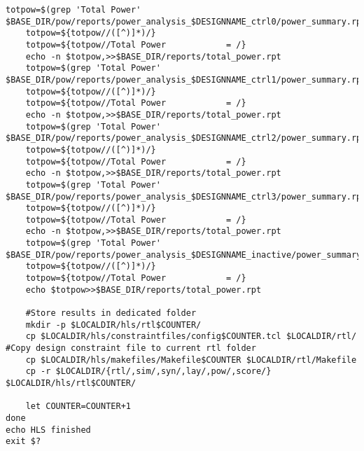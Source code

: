 \begin{lstlisting}[caption={HLS Script source code},label=lst:hlsscriptsourcecode]
	totpow=$(grep 'Total Power' $BASE_DIR/pow/reports/power_analysis_$DESIGNNAME_ctrl0/power_summary.rpt)
	totpow=${totpow//([^)]*)/}
	totpow=${totpow//Total Power            = /}
	echo -n $totpow,>>$BASE_DIR/reports/total_power.rpt
	totpow=$(grep 'Total Power' $BASE_DIR/pow/reports/power_analysis_$DESIGNNAME_ctrl1/power_summary.rpt)
	totpow=${totpow//([^)]*)/}
	totpow=${totpow//Total Power            = /}
	echo -n $totpow,>>$BASE_DIR/reports/total_power.rpt
	totpow=$(grep 'Total Power' $BASE_DIR/pow/reports/power_analysis_$DESIGNNAME_ctrl2/power_summary.rpt)
	totpow=${totpow//([^)]*)/}
	totpow=${totpow//Total Power            = /}
	echo -n $totpow,>>$BASE_DIR/reports/total_power.rpt
	totpow=$(grep 'Total Power' $BASE_DIR/pow/reports/power_analysis_$DESIGNNAME_ctrl3/power_summary.rpt)
	totpow=${totpow//([^)]*)/}
	totpow=${totpow//Total Power            = /}
	echo -n $totpow,>>$BASE_DIR/reports/total_power.rpt
	totpow=$(grep 'Total Power' $BASE_DIR/pow/reports/power_analysis_$DESIGNNAME_inactive/power_summary.rpt)
	totpow=${totpow//([^)]*)/}
	totpow=${totpow//Total Power            = /}
	echo $totpow>>$BASE_DIR/reports/total_power.rpt
	
	#Store results in dedicated folder
	mkdir -p $LOCALDIR/hls/rtl$COUNTER/
	cp $LOCALDIR/hls/constraintfiles/config$COUNTER.tcl $LOCALDIR/rtl/ #Copy design constraint file to current rtl folder
	cp $LOCALDIR/hls/makefiles/Makefile$COUNTER $LOCALDIR/rtl/Makefile
	cp -r $LOCALDIR/{rtl/,sim/,syn/,lay/,pow/,score/} $LOCALDIR/hls/rtl$COUNTER/
	
	let COUNTER=COUNTER+1 
done
echo HLS finished
exit $?
\end{lstlisting}

